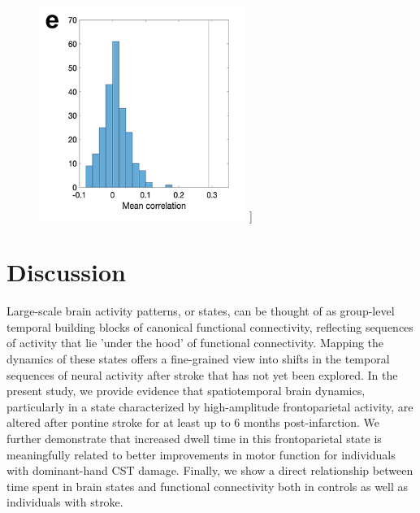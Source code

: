 \documentclass[phd,tocprelim]{cornell}
\renewcommand{\caption}[1]{\singlespacing\hangcaption{#1}\normalspacing}
\begin{document}
\null
\vfill
\clearpage    
    \null
\vfill
\begin{figure}[h!]
		\ContinuedFloat
		\captionsetup{labelformat=adja-page}
    \centering
    \includegraphics[width=0.6\textwidth]{chapter2/Figure6e.png}
    \caption[]{}
\end{figure}
\null
\vfill
\clearpage    
    \null
\vfill

\section{Discussion}
Large-scale brain activity patterns, or states, can be thought of as group-level temporal building blocks of canonical functional connectivity, reflecting sequences of activity that lie 'under the hood' of functional connectivity. Mapping the dynamics of these states offers a fine-grained view into shifts in the temporal sequences of neural activity after stroke that has not yet been explored. In the present study, we provide evidence that spatiotemporal brain dynamics, particularly in a state characterized by high-amplitude frontoparietal activity, are altered after pontine stroke for at least up to 6 months post-infarction. We further demonstrate that increased dwell time in this frontoparietal state is meaningfully related to better improvements in motor function for individuals with dominant-hand CST damage. Finally, we show a direct relationship between time spent in brain states and functional connectivity both in controls as well as individuals with stroke.
\end{document}
